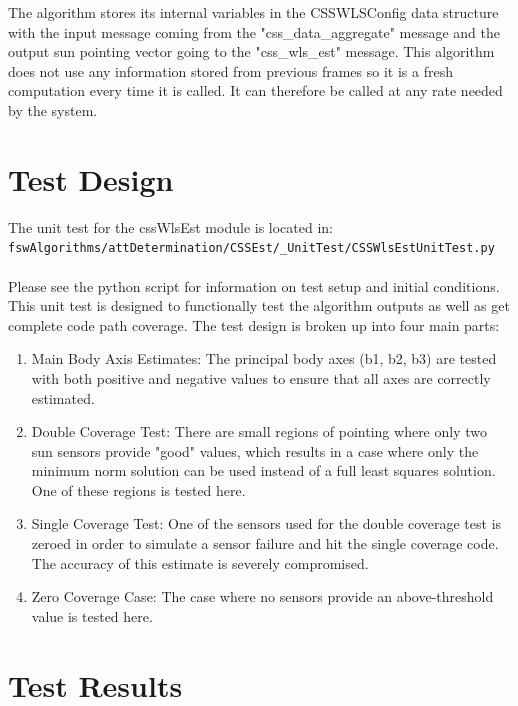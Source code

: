 \documentclass[]{BasiliskReportMemo}
\begin{document}
The algorithm stores its internal variables in the CSSWLSConfig data structure 
with the input message coming from the "css\_data\_aggregate" message and the 
output sun pointing vector going to the "css\_wls\_est" message.  This 
algorithm does not use any information stored from previous frames so it is a 
fresh computation every time it is called.  It can therefore be called at any 
rate needed by the system.

\section{Test Design}
The unit test for the cssWlsEst module is located in:\\

\noindent
{\tt fswAlgorithms/attDetermination/CSSEst/\_UnitTest/CSSWlsEstUnitTest.py} \\
\\

Please see the python script for information on test setup and initial 
conditions.  \\

\noindent This unit test is designed to functionally test the algorithm 
outputs as well as get complete code path coverage.  The test design is broken 
up into four main parts:\\
\begin{enumerate}
\item{Main Body Axis Estimates: The principal body axes (b1, b2, b3) are tested 
   with both positive and negative values to ensure that all axes are correctly 
   estimated.}
\item{Double Coverage Test: There are small regions of pointing where only two 
   sun sensors provide "good" values, which results in a case where only the 
   minimum norm solution can be used instead of a full least squares solution.  
   One of these regions is tested here.}
\item{Single Coverage Test: One of the sensors used for the double coverage test 
   is zeroed in order to simulate a sensor failure and hit the single coverage 
   code.  The accuracy of this estimate is severely compromised.}
\item{Zero Coverage Case: The case where no sensors provide an above-threshold 
   value is tested here.}
\end{enumerate}


\section{Test Results}
\end{document}

